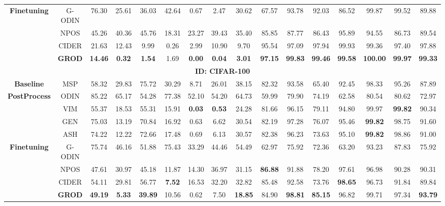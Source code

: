 \documentclass{article}
\theoremstyle{plain}
\theoremstyle{definition}
\theoremstyle{remark}
\begin{document}
\begin{table}[!t]
{\begin{tabular}{cccccccccccccccc}
\textbf{Finetuning} & \textsc{G-ODIN} & 76.30 & 25.61 & 36.03 & 42.64 & 0.67 & 2.47 & 30.62 & 67.57 & 93.78 & 92.03 & 86.52 & 99.87 & 99.52 & 89.88 \\
 & \textsc{NPOS} & 45.26 & 40.36 & 45.76 & 18.31 & 23.27 & 39.43 & 35.40 & 85.85 & 87.77 & 86.43 & 95.89 & 94.55 & 86.73 & 89.54 \\
 & \textsc{CIDER} & 21.63 & 12.43 & 9.99 & 0.26 & 2.99 & 10.90 & 9.70 & 95.54 & 97.09 & 97.94 & 99.93 & 99.36 & 97.40 & 97.88 \\ 
\rowcolor{gray!10} & \textsc{\textbf{GROD}} & \textbf{14.46} & \textbf{0.32} & \textbf{1.54} & 1.69 & \textbf{0.00} & \textbf{0.04} & \textbf{3.01} & \textbf{97.15} & \textbf{99.83} & \textbf{99.46} & \textbf{99.58} & \textbf{100.00} & \textbf{99.97} & \textbf{99.33} \\ \midrule
\multicolumn{16}{c}{\textbf{ID: CIFAR-100}} \\ \midrule
\textbf{Baseline} & \textsc{MSP} & 58.32 & 29.83 & 75.72 & 30.29 & 8.71 & 26.01 & 38.15 & 82.32 & 93.58 & 65.40 & 92.45 & 98.33 & 95.26 & 87.89 \\ \midrule
\textbf{PostProcess} & \textsc{ODIN} & 85.22 & 65.17 & 54.28 & 77.38 & 52.10 & 54.20 & 64.73 & 59.99 & 79.90 & 74.19 & 62.58 & 80.54 & 80.62 & 72.97 \\
 & \textsc{VIM} & 55.37 & 18.53 & 55.31 & 15.91 & \textbf{0.03} & \textbf{0.53} & 24.28 & 81.66 & 96.15 & 79.11 & 94.80 & 99.97 & \textbf{99.82} & 90.34 \\
 & \textsc{GEN} & 75.03 & 13.19 & 70.84 & 16.92 & 0.63 & 6.62 & 30.54 & 82.19 & 97.28 & 76.07 & 95.46 & \textbf{99.82} & 98.75 & 91.60 \\
 & \textsc{ASH} & 74.22 & 12.22 & 72.66 & 17.48 & 0.69 & 6.13 & 30.57 & 82.38 & 96.23 & 73.63 & 95.10 & \textbf{99.82} & 98.86 & 91.00 \\ \midrule
\textbf{Finetuning} & \textsc{G-ODIN} & 75.74 & 46.16 & 51.88 & 75.43 & 33.29 & 44.46 & 54.49 & 62.97 & 75.92 & 72.36 & 63.20 & 93.23 & 87.83 & 75.92 \\
 & \textsc{NPOS} & 47.61 & 30.97 & 45.18 & 11.87 & 14.30 & 36.97 & 31.15 & \textbf{86.88} & 91.88 & 78.20 & 97.61 & 96.98 & 90.28 & 90.31 \\
 & \textsc{CIDER} & 54.11 & 29.81 & 56.77 & \textbf{7.52} & 16.53 & 32.20 & 32.82 & 85.48 & 92.58 & 73.76 & \textbf{98.65} & 96.73 & 91.84 & 89.84 \\ 
\rowcolor{gray!10} & \textsc{\textbf{GROD}} & \textbf{49.19} & \textbf{5.33} & \textbf{39.89} & 10.56 & 0.62 & 7.50 & \textbf{18.85} & 84.90 & \textbf{98.81} & \textbf{85.15} & 96.82 & 99.71 & 97.34 & \textbf{93.79} \\ \bottomrule
\end{tabular}
}
\vspace{-0.8em}
\end{table}
\end{document}
